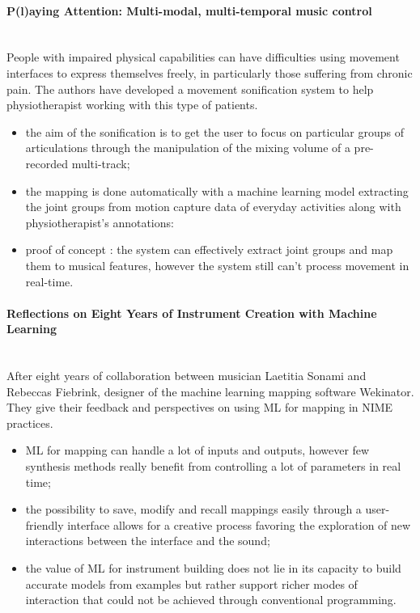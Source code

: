 \documentclass[11pt]{article}
\begin{document}
\paragraph{P(l)aying Attention: Multi-modal, multi-temporal music control} \citep{gold_playing_2020} \\
People with impaired physical capabilities can have difficulties using movement interfaces to express themselves freely, in particularly those suffering from chronic pain. The authors have developed a movement sonification system to help physiotherapist working with this type of patients.
\begin{itemize}
    \item the aim of the sonification is to get the user to focus on particular groups of articulations through the manipulation of the mixing volume of a pre-recorded multi-track;
    \item the mapping is done automatically with a machine learning model extracting the joint groups from motion capture data of everyday activities along with physiotherapist's annotations: 
    \item proof of concept : the system can effectively extract joint groups and map them to musical features, however the system still can't process movement in real-time.
\end{itemize}

\paragraph{Reflections on Eight Years of Instrument Creation with Machine Learning} \citep{fiebrink_reflections_2020} \\
After eight years of collaboration between musician Laetitia Sonami and Rebeccas Fiebrink, designer of the machine learning mapping software Wekinator. They give their feedback and perspectives on using ML for mapping in NIME practices.
\begin{itemize}
    \item ML for mapping can handle a lot of inputs and outputs, however few synthesis methods really benefit from controlling a lot of parameters in real time;
    \item the possibility to save, modify and recall mappings easily through a user-friendly interface allows for a creative process favoring the exploration of new interactions between the interface and the sound;
    \item the value of ML for instrument building does not lie in its capacity to build accurate models from examples but rather support richer modes of interaction that could not be achieved through conventional programming.
\end{itemize}
\end{document}
